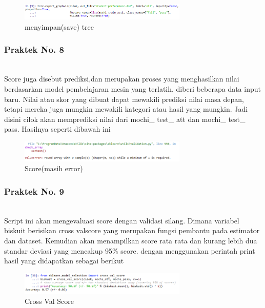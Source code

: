 \begin{figure}[H]
    \includegraphics[width=8cm]{figures/1174083/figures2/p7.png}
    \centering
    \caption{menyimpan(save) tree}
\end{figure}

\subsubsection{Praktek No. 8}
\hfill\\

Score juga disebut prediksi,dan merupakan proses yang menghasilkan nilai berdasarkan model pembelajaran mesin yang terlatih, diberi beberapa data input baru. Nilai atau skor yang dibuat dapat mewakili prediksi nilai masa depan, tetapi mereka juga mungkin mewakili kategori atau hasil yang mungkin. Jadi disini cilok akan memprediksi nilai dari mochi\_ test\_ att dan mochi\_ test\_ pass. Hasilnya seperti dibawah ini 

\begin{figure}[H]
    \includegraphics[width=8cm]{figures/1174083/figures2/error3.png}
    \centering
    \caption{Score(masih error)}
\end{figure}

\subsubsection{Praktek No. 9}
\hfill\\

Script ini akan mengevaluasi score dengan validasi silang. Dimana variabel biskuit berisikan cross valscore yang merupakan fungsi pembantu pada estimator dan dataset. Kemudian akan menampilkan score rata rata dan kurang lebih dua standar deviasi yang mencakup 95\% score. dengan menggunakan perintah print hasil yang didapatkan sebagai berikut

\begin{figure}[H]
    \includegraphics[width=8cm]{figures/1174083/figures2/p9.png}
    \centering
    \caption{Cross Val Score}
\end{figure}

